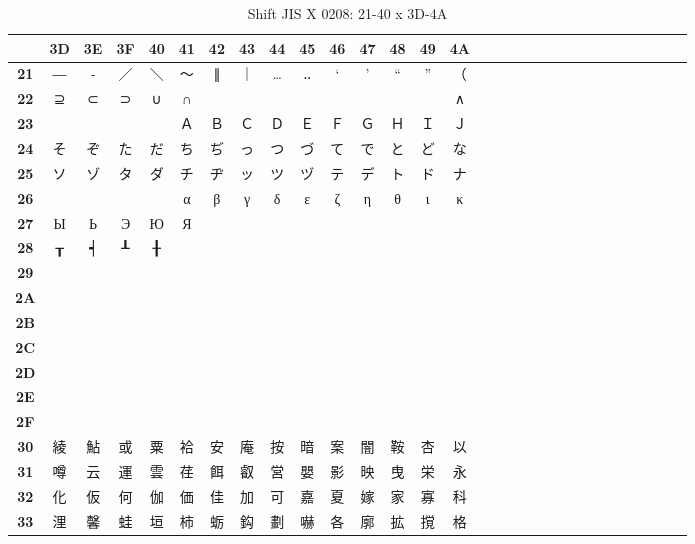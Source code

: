 \begin{table}[H]
\centering
\caption{Shift JIS X 0208: 21-40 x 3D-4A}
\begin{tabular}{|Sc|Sc|Sc|Sc|Sc|Sc|Sc|Sc|Sc|Sc|Sc|Sc|Sc|Sc|Sc|}
\hline
 & \textbf{3D} & \textbf{3E} & \textbf{3F} & \textbf{40} & \textbf{41} & \textbf{42} & \textbf{43} & \textbf{44} & \textbf{45} & \textbf{46} & \textbf{47} & \textbf{48} & \textbf{49} & \textbf{4A} \\ \hline
\textbf{21} & ― & ‐ & ／ & ＼ & ～ & ∥ & ｜ & … & ‥ & ‘ & ’ & “ & ” & （ \\ \hline
\textbf{22} & ⊇ & ⊂ & ⊃ & ∪ & ∩ &   &   &   &   &   &   &   &   & ∧ \\ \hline
\textbf{23} &   &   &   &   & Ａ & Ｂ & Ｃ & Ｄ & Ｅ & Ｆ & Ｇ & Ｈ & Ｉ & Ｊ \\ \hline
\textbf{24} & そ & ぞ & た & だ & ち & ぢ & っ & つ & づ & て & で & と & ど & な \\ \hline
\textbf{25} & ソ & ゾ & タ & ダ & チ & ヂ & ッ & ツ & ヅ & テ & デ & ト & ド & ナ \\ \hline
\textbf{26} &   &   &   &   & α & β & γ & δ & ε & ζ & η & θ & ι & κ \\ \hline
\textbf{27} & Ы & Ь & Э & Ю & Я &   &   &   &   &   &   &   &   &   \\ \hline
\textbf{28} & ┰ & ┥ & ┸ & ╂ &  &  &  &  &  &  &  &  &  &  \\ \hline
\textbf{29} &  &  &  &  &  &  &  &  &  &  &  &  &  &  \\ \hline
\textbf{2A} &  &  &  &  &  &  &  &  &  &  &  &  &  &  \\ \hline
\textbf{2B} &  &  &  &  &  &  &  &  &  &  &  &  &  &  \\ \hline
\textbf{2C} &  &  &  &  &  &  &  &  &  &  &  &  &  &  \\ \hline
\textbf{2D} &  &  &  &  &  &  &  &  &  &  &  &  &  &  \\ \hline
\textbf{2E} &  &  &  &  &  &  &  &  &  &  &  &  &  &  \\ \hline
\textbf{2F} &  &  &  &  &  &  &  &  &  &  &  &  &  &  \\ \hline
\textbf{30} & 綾 & 鮎 & 或 & 粟 & 袷 & 安 & 庵 & 按 & 暗 & 案 & 闇 & 鞍 & 杏 & 以 \\ \hline
\textbf{31} & 噂 & 云 & 運 & 雲 & 荏 & 餌 & 叡 & 営 & 嬰 & 影 & 映 & 曳 & 栄 & 永 \\ \hline
\textbf{32} & 化 & 仮 & 何 & 伽 & 価 & 佳 & 加 & 可 & 嘉 & 夏 & 嫁 & 家 & 寡 & 科 \\ \hline
\textbf{33} & 浬 & 馨 & 蛙 & 垣 & 柿 & 蛎 & 鈎 & 劃 & 嚇 & 各 & 廓 & 拡 & 撹 & 格 \\ \hline

\end{tabular}
\end{table}
